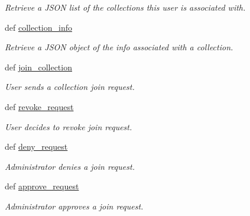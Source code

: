 \begin{DoxyCompactItemize}
\begin{DoxyCompactList}\small\item\em Retrieve a JSON list of the collections this user is associated with. \item\end{DoxyCompactList}\item 
def \hyperlink{namespaceconcertapp_1_1collection_1_1views_ab159179c53d7c8d4ede8e892fbbb09ff}{collection\_\-info}
\begin{DoxyCompactList}\small\item\em Retrieve a JSON object of the info associated with a collection. \item\end{DoxyCompactList}\item 
def \hyperlink{namespaceconcertapp_1_1collection_1_1views_a89bfd4da3d6583408a8a283f39dbee67}{join\_\-collection}
\begin{DoxyCompactList}\small\item\em User sends a collection join request. \item\end{DoxyCompactList}\item 
def \hyperlink{namespaceconcertapp_1_1collection_1_1views_a278d3a9f377b8a2befe804cba14e4886}{revoke\_\-request}
\begin{DoxyCompactList}\small\item\em User decides to revoke join request. \item\end{DoxyCompactList}\item 
def \hyperlink{namespaceconcertapp_1_1collection_1_1views_aa4871b25ad87d71efe40a25a4a71c496}{deny\_\-request}
\begin{DoxyCompactList}\small\item\em Administrator denies a join request. \item\end{DoxyCompactList}\item 
def \hyperlink{namespaceconcertapp_1_1collection_1_1views_a7cdb4e6cd1a9755c91404c56e52401d5}{approve\_\-request}
\begin{DoxyCompactList}\small\item\em Administrator approves a join request. \item\end{DoxyCompactList}\end{DoxyCompactItemize}


